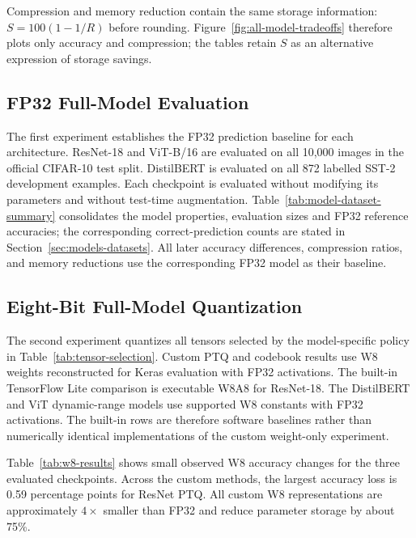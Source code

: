 \documentclass[conference]{IEEEtran}
\begin{document}
Compression and memory reduction contain the same storage information: $S=100(1-1/R)$ before rounding. Figure~\ref{fig:all-model-tradeoffs} therefore plots only accuracy and compression; the tables retain $S$ as an alternative expression of storage savings.

\subsection{FP32 Full-Model Evaluation}

The first experiment establishes the FP32 prediction baseline for each architecture. ResNet-18 and ViT-B/16 are evaluated on all 10,000 images in the official CIFAR-10 test split. DistilBERT is evaluated on all 872 labelled SST-2 development examples. Each checkpoint is evaluated without modifying its parameters and without test-time augmentation. Table~\ref{tab:model-dataset-summary} consolidates the model properties, evaluation sizes and FP32 reference accuracies; the corresponding correct-prediction counts are stated in Section~\ref{sec:models-datasets}. All later accuracy differences, compression ratios, and memory reductions use the corresponding FP32 model as their baseline.



\subsection{Eight-Bit Full-Model Quantization}

The second experiment quantizes all tensors selected by the model-specific policy in Table~\ref{tab:tensor-selection}. Custom PTQ and codebook results use W8 weights reconstructed for Keras evaluation with FP32 activations. The built-in TensorFlow Lite comparison is executable W8A8 for ResNet-18. The DistilBERT and ViT dynamic-range models use supported W8 constants with FP32 activations. The built-in rows are therefore software baselines rather than numerically identical implementations of the custom weight-only experiment.

Table~\ref{tab:w8-results} shows small observed W8 accuracy changes for the three evaluated checkpoints. Across the custom methods, the largest accuracy loss is 0.59 percentage points for ResNet PTQ. All custom W8 representations are approximately $4\times$ smaller than FP32 and reduce parameter storage by about 75\%.
\end{document}
